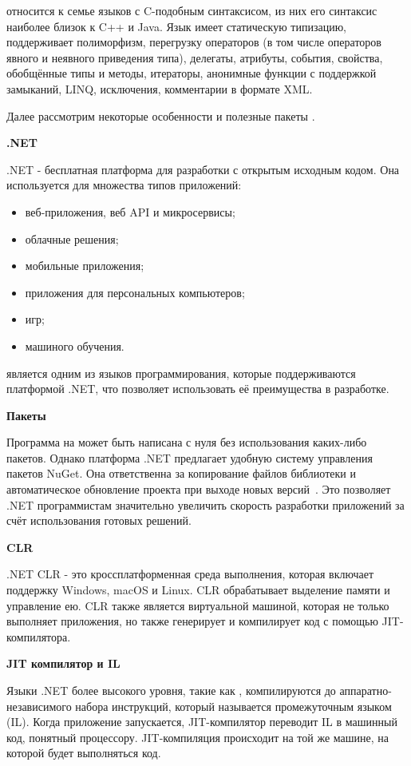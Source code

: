 \csharp относится к семье языков с C-подобным синтаксисом, из них его синтаксис наиболее близок к C++ и Java. Язык имеет статическую типизацию, поддерживает полиморфизм, перегрузку операторов (в том числе операторов явного и неявного приведения типа), делегаты, атрибуты, события, свойства, обобщённые типы и методы, итераторы, анонимные функции с поддержкой замыканий, LINQ, исключения, комментарии в формате XML.

Далее рассмотрим некоторые особенности и полезные пакеты \csharp.

\bigskip
\textbf{.NET}

.NET - бесплатная платформа для разработки с открытым исходным кодом. Она используется для множества типов приложений:
\begin{itemize}
    \item веб-приложения, веб API и микросервисы;
    \item облачные решения;
    \item мобильные приложения;
    \item приложения для персональных компьютеров;
    \item игр;
    \item машиного обучения.
\end{itemize}

\csharp является одним из языков программирования, которые поддерживаются платформой .NET, что позволяет использовать её преимущества в разработке.

\bigskip
\textbf{Пакеты}

Программа на \csharp может быть написана с нуля без использования каких-либо пакетов. Однако платформа .NET предлагает удобную систему управления пакетов NuGet. Она ответственна за копирование файлов библиотеки и автоматическое обновление проекта при выходе новых версий~\cite{wiki_nuget}. Это позволяет .NET программистам значительно увеличить скорость разработки приложений за счёт использования готовых решений.

\bigskip
\textbf{CLR}

.NET CLR - это кроссплатформенная среда выполнения, которая включает поддержку Windows, macOS и Linux. CLR обрабатывает выделение памяти и управление ею. CLR также является виртуальной машиной, которая не только выполняет приложения, но также генерирует и компилирует код с помощью JIT-компилятора.

\bigskip
\textbf{JIT компилятор и IL}

Языки .NET более высокого уровня, такие как \csharp, компилируются до аппаратно-независимого набора инструкций, который называется промежуточным языком (IL). Когда приложение запускается, JIT-компилятор переводит IL в машинный код, понятный процессору. JIT-компиляция происходит на той же машине, на которой будет выполняться код.

